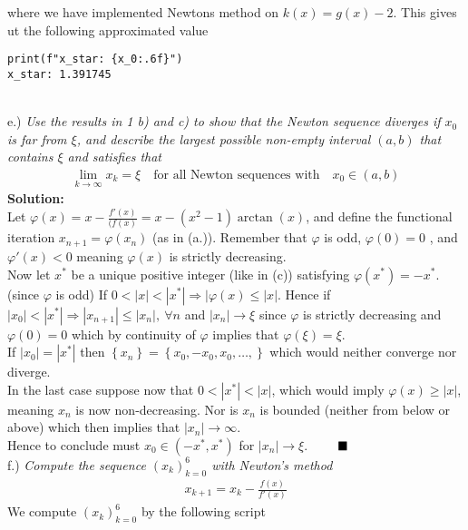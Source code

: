 \documentclass[12pt,
               a4paper,
               article,
               oneside,
               norsk,oldfontcommands]{memoir}
\newcommand{\Q}{ \qquad \hfill \blacksquare}
\newcommand{\bl}{\left\{}
\newcommand{\br}{\right\}}
\newcommand{\spaze}{\vspace{4mm}\\}
\begin{document}
where we have implemented Newtons method on $k(x) = g(x) - 2$. This gives ut the following approximated value 
\begin{verbatim}
print(f"x_star: {x_0:.6f}")
x_star: 1.391745
\end{verbatim} \spaze
e.) \emph{Use the results in 1 b) and c) to show that the Newton sequence diverges if $x_0$ is far from $\xi$, and describe the largest possible non-empty interval $(a, b)$ that contains $\xi$ and satisfies that} 
\begin{align*}
\lim_{k \to \infty} x_{k} = \xi \quad \text{for all Newton sequences with} \quad x_0 \in (a,b) 
\end{align*}
\textbf{Solution:} \spaze 
Let $\varphi (x) = x - \frac{f'(x)}{(f(x)} = x - (x^2 -1)\arctan(x)$, and define the functional iteration $x_{n+1} = \varphi(x_n)$ (as in (a.)). Remember that $\varphi$ is odd, $\varphi(0) = 0$ , and $\varphi'(x) < 0 $  meaning $\varphi(x)$ is strictly decreasing. \vspace{2mm }\\
Now let $x^{*}$ be a unique positive integer (like in (c)) satisfying $\varphi(x^{*}) = -x^{*}$. (since $\varphi$ is odd) If $ 0 < |x| < |x^{*}| \Rightarrow |\varphi(x) \leq |x|$. Hence if $|x_0| < |x^{*}| \Rightarrow |x_{n+1}| \leq |x_n|, \ \forall n$ and $|x_n| \rightarrow \xi$ since $\varphi$ is strictly decreasing and $\varphi(0) = 0$ which by continuity of $\varphi$ implies that $\varphi(\xi) = \xi$. \vspace{3mm}\\
If $|x_0| = |x^{*}|$ then $\left\{ x_n \right\} = \bl x_0, -x_0, x_0, \ldots, \br$ which would neither converge nor diverge. \vspace{3mm}\\
In the last case suppose now that $0 < |x^{*}| < |x|$, which would imply $\varphi(x) \geq |x|$, meaning $x_n$ is now non-decreasing. Nor is $x_n$ is bounded (neither from below or above) which then implies that $|x_n| \rightarrow \infty$. \vspace{3mm}\\
Hence to conclude must $x_0 \in (-x^{*}, x^{*})$ for $|x_n| \rightarrow \xi$. $\Q$ \spaze 
f.) \emph{Compute the sequence $(x_k)_{k=0}^{6}$ with Newton’s method}
\begin{align*}
x_{k+1} = x_k - \frac{f(x)}{f'(x)}
\end{align*}
We compute  $(x_k)_{k=0}^{6}$  by the following script 
\end{document}
